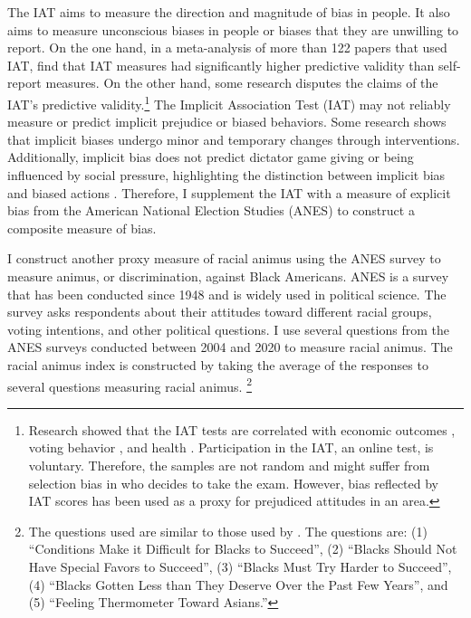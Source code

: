 The IAT aims to measure the direction and magnitude of bias in people. It also aims to measure unconscious biases in people or biases that they are unwilling to report. On the one hand, in a meta-analysis of more than 122 papers that used IAT, \textcite{greenwaldMeasuringIndividualDifferences1998} find that IAT measures had significantly higher predictive validity than self-report measures. On the other hand, some research disputes the claims of the IAT's predictive validity.\footnote{Research showed that the IAT tests are correlated with economic outcomes \autocite{chettyRaceEconomicOpportunity2020,gloverDiscriminationSelfFulfillingProphecy2017}, voting behavior \autocite{friesePredictingVotingBehavior2007}, and health \autocite{leitnerRacialBiasAssociated2016}. Participation in the IAT, an online test, is voluntary. Therefore, the samples are not random and might suffer from selection bias in who decides to take the exam. However, bias reflected by IAT scores has been used as a proxy for prejudiced attitudes in an area\autocite{chettyRaceEconomicOpportunity2020}.} The Implicit Association Test (IAT) may not reliably measure or predict implicit prejudice or biased behaviors. Some research shows that implicit biases undergo minor and temporary changes through interventions. Additionally, implicit bias does not predict dictator game giving or being influenced by social pressure, highlighting the distinction between implicit bias and biased actions \autocite{arkesAttributionsImplicitPrejudice2004,forscherMetaanalysisProceduresChange2019,leeDoesImplicitBias2018}. Therefore, I supplement the IAT with a measure of explicit bias from the American National Election Studies (ANES) to construct a composite measure of bias. 

I construct another proxy measure of racial animus using the ANES survey \textcite{anes2021} to measure animus, or discrimination, against Black Americans. ANES is a survey that has been conducted since 1948 and is widely used in political science. The survey asks respondents about their attitudes toward different racial groups, voting intentions, and other political questions. I use several questions from the ANES surveys conducted between 2004 and 2020 to measure racial animus. The racial animus index is constructed by taking the average of the responses to several questions measuring racial animus. \footnote{The questions used are similar to those used by \textcite{charlesPrejudiceWagesEmpirical2008}. The questions are: (1) ``Conditions Make it Difficult for Blacks to Succeed'', (2) ``Blacks Should Not Have Special Favors to Succeed'', (3) ``Blacks Must Try Harder to Succeed'', (4) ``Blacks Gotten Less than They Deserve Over the Past Few Years'', and (5) ``Feeling Thermometer Toward Asians.''}

